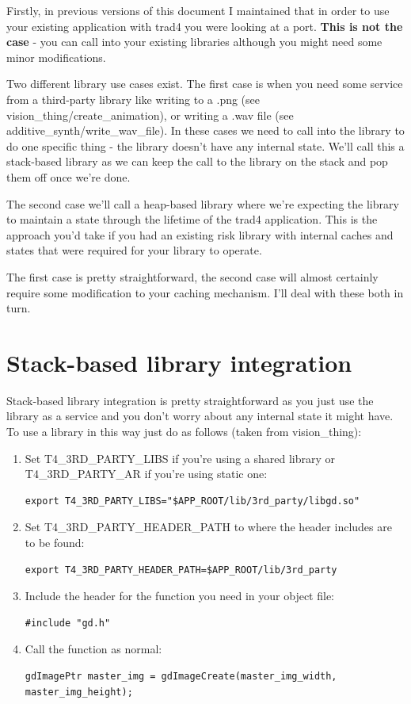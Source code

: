 \documentclass{report}
\begin{document}
Firstly, in previous versions of this document I maintained that in order to use your existing application with trad4 you were looking at a port. \textbf{This is not the case} - you can call into your existing libraries although you might need some minor modifications.

Two different library use cases exist. The first case is when you need some service from a third-party library like writing to a .png (see vision_thing/create_animation), or writing a .wav file (see additive_synth/write_wav_file). In these cases we need to call into the library to do one specific thing - the library doesn't have any internal state. We'll call this a stack-based library as we can keep the call to the library on the stack and pop them off once we're done.

The second case we'll call a heap-based library where we're expecting the library to maintain a state through the lifetime of the trad4 application. This is the approach you'd take if you had an existing risk library with internal caches and states that were required for your library to operate.

The first case is pretty straightforward, the second case will almost certainly require some modification to your caching mechanism. I'll deal with these both in turn.

\section{Stack-based library integration}

Stack-based library integration is pretty straightforward as you just use the library as a service and you don't worry about any internal state it might have. To use a library in this way just do as follows (taken from vision_thing):

\begin{enumerate}

\item Set T4_3RD_PARTY_LIBS if you're using a shared library or T4_3RD_PARTY_AR if you're using static one:
\begin{verbatim}
export T4_3RD_PARTY_LIBS="$APP_ROOT/lib/3rd_party/libgd.so"
\end{verbatim}

\item Set T4_3RD_PARTY_HEADER_PATH to where the header includes are to be found:
\begin{verbatim}
export T4_3RD_PARTY_HEADER_PATH=$APP_ROOT/lib/3rd_party
\end{verbatim}

\item Include the header for the function you need in your object file:
\begin{verbatim}
#include "gd.h"
\end{verbatim}

\item Call the function as normal:
\begin{verbatim}
gdImagePtr master_img = gdImageCreate(master_img_width, master_img_height);
\end{verbatim}

\end{enumerate}
\end{document}
